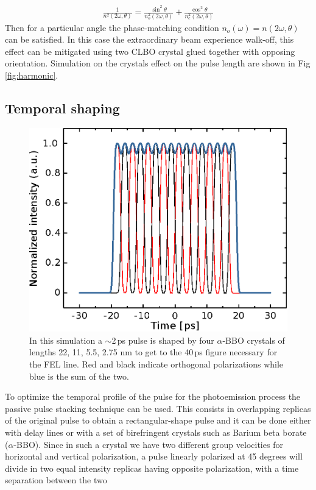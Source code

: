 \begin{align}
\frac{1}{n^2(2\omega,\theta)} = \frac{\sin^2\theta}{n^2_o(2\omega,\theta)} + \frac{\cos^2\theta}{n^2_e(2\omega,\theta)}
\end{align}
Then for a particular angle the phase-matching condition $n_o(\omega)=n(2\omega,\theta)$ can be satisfied. In this case the extraordinary beam experience walk-off, this effect can be mitigated using two CLBO crystal glued together with opposing orientation. Simulation on the crystals effect on the pulse length are shown in Fig \ref{fig:harmonic}.

\subsection{Temporal shaping}
\begin{figure}
	\centering
	\includegraphics[width=0.9\linewidth]{images/temporal.eps}
	\caption{In this simulation a $\sim$2\,ps pulse is shaped by four $\alpha$-BBO crystals of lengths 22, 11, 5.5, 2.75 nm to get to the 40\,ps figure necessary for the FEL line. Red and black indicate orthogonal polarizations while blue is the sum of the two.}
	\label{fig:temporal}
\end{figure}
To optimize the temporal profile of the pulse for the photoemission process the passive pulse stacking technique can be used. This consists in overlapping replicas of the original pulse to obtain a rectangular-shape pulse and it can be done either with delay lines or with a set of birefringent crystals such as Barium beta borate ($\alpha$-BBO). Since in such a crystal we have two different group velocities for horizontal and vertical polarization, a pulse linearly polarized at 45 degrees will divide in two equal intensity replicas having opposite polarization, with a time separation between the two
